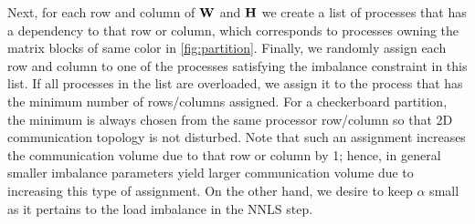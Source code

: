 Next, for each row and column of $\mathbf{W}$ and $\mathbf{H}$ we create a list of processes that has a dependency to that row or column, which corresponds to processes owning the matrix blocks of same color in \cref{fig:partition}.
Finally, we randomly assign each row and column to one of the processes satisfying the imbalance constraint in this list.
If all processes in the list are overloaded, we assign it to the process that has the minimum number of rows/columns assigned.
For a checkerboard partition, the minimum is always chosen from the same processor row/column so that 2D communication topology is not disturbed.
Note that such an assignment increases the communication volume due to that row or column by 1; hence, in general smaller imbalance parameters yield larger communication volume due to increasing this type of assignment.
On the other hand, we desire to keep $\alpha$ small as it pertains to the load imbalance in the NNLS step.

